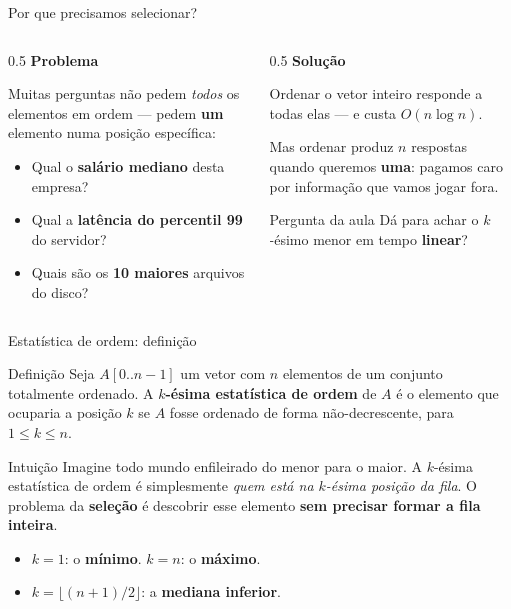 \documentclass[aspectratio=169]{beamer}
\begin{document}
\begin{frame}{Por que precisamos selecionar?}
  \begin{columns}[T]
    \begin{column}{0.5\textwidth}
      \textbf{Problema}

      \medskip
      Muitas perguntas não pedem \emph{todos} os elementos em ordem --- pedem
      \textbf{um} elemento numa posição específica:
      \begin{itemize}
        \item Qual o \textbf{salário mediano} desta empresa?
        \item Qual a \textbf{latência do percentil 99} do servidor?
        \item Quais são os \textbf{10 maiores} arquivos do disco?
      \end{itemize}
    \end{column}
    \begin{column}{0.5\textwidth}
      \textbf{Solução}

      \medskip
      Ordenar o vetor inteiro responde a todas elas --- e custa $O(n\log n)$.

      \medskip
      Mas ordenar produz $n$ respostas quando queremos \textbf{uma}: pagamos
      caro por informação que vamos jogar fora.

      \begin{block}{Pergunta da aula}
        Dá para achar o $k$-ésimo menor em tempo \textbf{linear}?
      \end{block}
    \end{column}
  \end{columns}
\end{frame}

\begin{frame}{Estatística de ordem: definição}
  \begin{block}{Definição}
    Seja $A[0..n-1]$ um vetor com $n$ elementos de um conjunto totalmente
    ordenado. A \textbf{$k$-ésima estatística de ordem} de $A$ é o elemento que
    ocuparia a posição $k$ se $A$ fosse ordenado de forma não-decrescente,
    para $1 \le k \le n$.
  \end{block}

  \begin{exampleblock}{Intuição}
    Imagine todo mundo enfileirado do menor para o maior. A $k$-ésima
    estatística de ordem é simplesmente \emph{quem está na $k$-ésima posição
    da fila}. O problema da \textbf{seleção} é descobrir esse elemento
    \textbf{sem precisar formar a fila inteira}.
  \end{exampleblock}

  \begin{itemize}
    \item $k = 1$: o \textbf{mínimo}. \qquad $k = n$: o \textbf{máximo}.
    \item $k = \lfloor (n+1)/2 \rfloor$: a \textbf{mediana inferior}.
  \end{itemize}
\end{frame}
\end{document}
